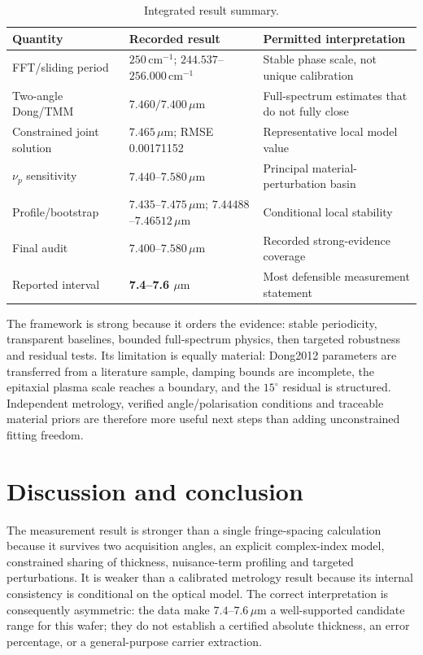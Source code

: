 \documentclass[10pt,a4paper]{article}
\newcommand{\um}{\ensuremath{\mu\mathrm{m}}}
\newcommand{\wn}{\ensuremath{\mathrm{cm}^{-1}}}
\begin{document}
\begin{table}[H]\centering\small
\caption{Integrated result summary.}\label{tab:summary}
\begin{tabular}{p{.35\linewidth}p{.24\linewidth}p{.30\linewidth}}\toprule
Quantity & Recorded result & Permitted interpretation\\\midrule
FFT/sliding period & $250\,\wn$; $244.537$--$256.000\,\wn$ & Stable phase scale, not unique calibration\\
Two-angle Dong/TMM & $7.460/7.400\,\um$ & Full-spectrum estimates that do not fully close\\
Constrained joint solution & $7.465\,\um$; RMSE 0.00171152 & Representative local model value\\
$\nu_p$ sensitivity & $7.440$--$7.580\,\um$ & Principal material-perturbation basin\\
Profile/bootstrap & $7.435$--$7.475\,\um$; $7.44488$--$7.46512\,\um$ & Conditional local stability\\
Final audit & $7.400$--$7.580\,\um$ & Recorded strong-evidence coverage\\
Reported interval & \textbf{7.4--7.6 $\um$} & Most defensible measurement statement\\\bottomrule
\end{tabular}
\end{table}

The framework is strong because it orders the evidence: stable periodicity, transparent baselines, bounded full-spectrum physics, then targeted robustness and residual tests. Its limitation is equally material: Dong2012 parameters are transferred from a literature sample, damping bounds are incomplete, the epitaxial plasma scale reaches a boundary, and the $15^\circ$ residual is structured. Independent metrology, verified angle/polarisation conditions and traceable material priors are therefore more useful next steps than adding unconstrained fitting freedom.

\section{Discussion and conclusion}
The measurement result is stronger than a single fringe-spacing calculation because it survives two acquisition angles, an explicit complex-index model, constrained sharing of thickness, nuisance-term profiling and targeted perturbations. It is weaker than a calibrated metrology result because its internal consistency is conditional on the optical model. The correct interpretation is consequently asymmetric: the data make $7.4$--$7.6\,\um$ a well-supported candidate range for this wafer; they do not establish a certified absolute thickness, an error percentage, or a general-purpose carrier extraction.
\end{document}
